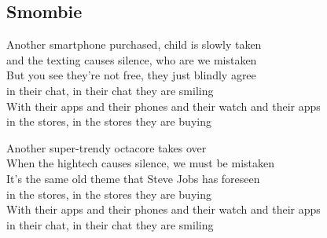 \subsection[Smombie]{Smombie}

 Another smartphone purchased, child is slowly taken \\
 and the texting causes silence, who  are we mistaken \\

But you see  they're not free, they just blindly agree \\
in their chat, in their chat they are smiling \\
With their apps and their phones and their watch  and their apps \\
in the stores, in the stores they are buying \\


Another super-trendy octacore takes over \\
When the hightech causes silence, we must be mistaken \\

It's the same old theme that Steve Jobs has foreseen \\
in the stores, in the stores they are buying \\
With their apps and their phones and their watch and their apps \\
in their chat, in their chat they are smiling \\


\pagebreak
